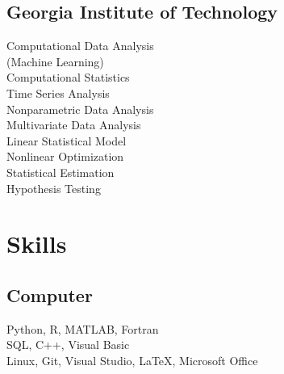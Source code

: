 \documentclass[]{hieudo-build}
\begin{document}
\begin{minipage}[t]{0.34\textwidth}
\subsection{Georgia Institute of Technology}
Computational Data Analysis \\
(Machine Learning) \\
Computational Statistics \\
Time Series Analysis \\
Nonparametric Data Analysis \\
Multivariate Data Analysis \\
Linear Statistical Model \\
Nonlinear Optimization \\
Statistical Estimation \\
Hypothesis Testing 

\section{Skills}
\subsection{Computer}
Python, R, MATLAB, Fortran \\ 
SQL, C++, Visual Basic \\
Linux, Git, Visual Studio, \LaTeX, Microsoft Office \\
\sectionsep





\end{minipage}
\end{document}
